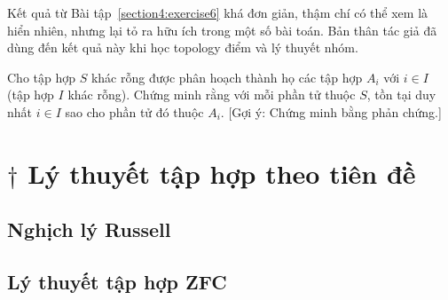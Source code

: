 Kết quả từ Bài tập~\ref{section4:exercise6} khá đơn giản, thậm chí có thể xem là hiển nhiên, nhưng lại tỏ ra hữu ích trong một số bài toán. Bản thân tác giả đã dùng đến kết quả này khi học topology điểm và lý thuyết nhóm.

\begin{exercise}\label{section4:exercise7}
    Cho tập hợp $S$ khác rỗng được phân hoạch thành họ các tập hợp $A_{i}$ với $i\in I$ (tập hợp $I$ khác rỗng). Chứng minh rằng với mỗi phần tử thuộc $S$, tồn tại duy nhất $i\in I$ sao cho phần tử đó thuộc $A_{i}$. [Gợi ý: Chứng minh bằng phản chứng.]
\end{exercise}


\section{$\dagger$ Lý thuyết tập hợp theo tiên đề}\label{section5:axiomatic-set-theory}

\subsection*{Nghịch lý Russell}

\subsection*{Lý thuyết tập hợp ZFC}
